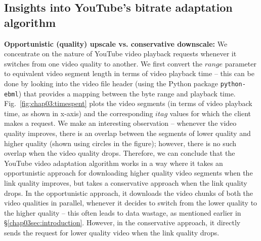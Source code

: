 \subsection{Insights into YouTube's bitrate adaptation algorithm}
\label{chap03subsec:seglength}
{\bf Opportunistic (quality) upscale vs. conservative downscale:} We concentrate on the nature of YouTube video playback requests whenever it switches from one video quality to another.
We first convert the $range$ parameter to equivalent video segment length in terms of video playback time -- this can be done by looking into the video file header (using the Python package \texttt{python-ebml}) that provides a mapping between the byte range and playback time.
Fig.~\ref{fig:chap03:timespent} plots the video segments (in terms of video playback time, as shown in x-axis) and the corresponding $itag$ values for which the client makes a request.
We make an interesting observation -- whenever the video quality improves, there is an overlap between the segments of lower quality and higher quality (shown using circles in the figure); however, there is no such overlap when the video quality drops.
Therefore, we can conclude that the YouTube video adaptation algorithm works in a way where it takes an opportunistic approach for downloading higher quality video segments when the link quality improves, but takes a conservative approach when the link quality drops.
In the opportunistic approach, it downloads the video chunks of both the video qualities in parallel, whenever it decides to switch from the lower quality to the higher quality -- this often leads to data wastage, as mentioned earlier in \S\ref{chap03sec:introduction}.
However, in the conservative approach, it directly sends the request for lower quality video when the link quality drops.

